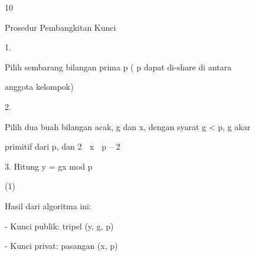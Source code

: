 \documentclass{article}
\begin{document}

10

Prosedur Pembangkitan Kunci

1.

Pilih sembarang bilangan prima p ( p dapat di-share di antara 

anggota kelompok)

2.

Pilih dua buah bilangan acak, g dan x, dengan syarat g < p, g akar 

primitif dari p, dan  2  x  p – 2 

3.    Hitung y = gx mod p  



     (1)



Hasil dari algoritma ini:


- Kunci publik: tripel (y, g, p)


- Kunci privat: pasangan (x, p)
\end{document}
